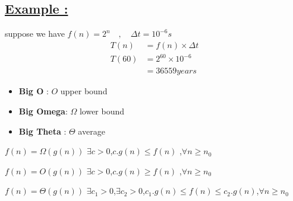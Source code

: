\subsection*{\underline{Example :}}
suppose we have \(f(n) = 2 ^ n \quad, \quad \Delta t = 10^{-6} s \)
\begin{align*}
    T(n) &= f(n) \times \Delta t\\
    T(60) &= 2^{60} \times 10^{-6}\\
    &= \boxed{36559 years}
\end{align*}

\begin{tcolorbox}[enhanced, colback=white!90!greenPlot, colframe=greenPlot!60!black, coltitle=white, fonttitle=\bfseries\Large, title=Landau Notation, boxrule=1mm, arc=0.5mm, drop shadow=greenPlot!35!gray]
\begin{itemize}
    \item \textbf{Big O} : \(O\) upper bound
    \item \textbf{Big Omega}: \(\Omega\) lower bound 
    \item \textbf{Big Theta} : \(\Theta\) average
\end{itemize}
\end{tcolorbox}

\vspace{0.5cm}

\begin{tcolorbox}[enhanced, colback=white!90!greenPlot, colframe=greenPlot!60!black, coltitle=white, fonttitle=\bfseries\Large, title=Landau Notation Mathematical Definition, boxrule=1mm, arc=0.5mm, drop shadow=greenPlot!35!gray]
    \(f(n) = \Omega(g(n))\) \quad \( \exists c > 0\)\hspace{0.1cm},\quad \(c . g(n) \leq f(n)\) \quad ,\hspace{0.1cm}\(\forall n \geq n_0\)


\vspace{0.15cm}
\(f(n) = O(g(n))\) \quad \(\exists c > 0\)\hspace{0.1cm},\quad\(c . g(n) \geq f(n)\) \quad ,\hspace{0.1cm}\(\forall n \geq n_0\)

\vspace{0.15cm}
\(f(n) = \Theta(g(n))\) \quad \(\exists c_1 > 0\)\hspace{0.1cm},\hspace{0.1cm}\(\exists c_2 > 0\)\hspace{0.1cm},\quad \(c_1 . g(n) \leq f(n) \leq c_2. g(n)\)\quad  ,\hspace{0.1cm}\(\forall n \geq n_0\)

\end{tcolorbox}
\newpage
